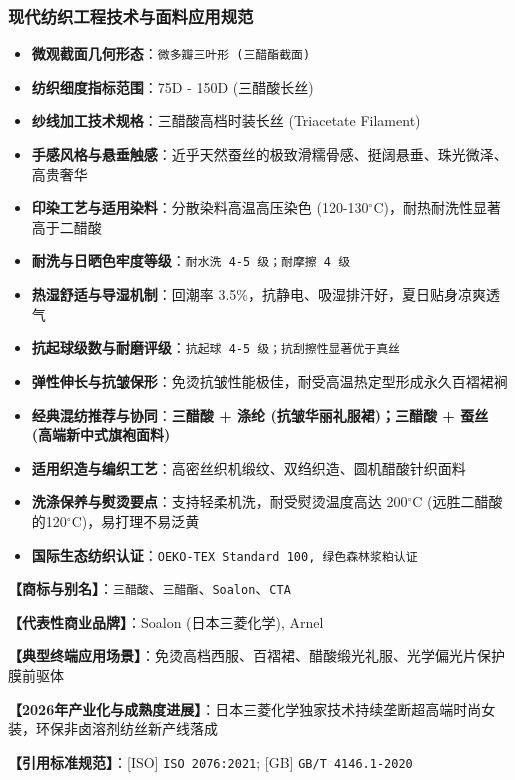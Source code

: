 \documentclass[11pt,openright,twoside,UTF8]{ctexbook}
\begin{document}
\subsubsection*{现代纺织工程技术与面料应用规范}
\begin{itemize} \setlength{\itemsep}{2pt}
    \item \textbf{微观截面几何形态}：\texttt{微多瓣三叶形 (三醋酯截面)}
    \item \textbf{纺织细度指标范围}：75D - 150D (三醋酸长丝)
    \item \textbf{纱线加工技术规格}：三醋酸高档时装长丝 (Triacetate Filament)
    \item \textbf{手感风格与悬垂触感}：近乎天然蚕丝的极致滑糯骨感、挺阔悬垂、珠光微泽、高贵奢华
    \item \textbf{印染工艺与适用染料}：分散染料高温高压染色 (120-130$^\circ\mathrm{C}$)，耐热耐洗性显著高于二醋酸
    \item \textbf{耐洗与日晒色牢度等级}：\texttt{耐水洗 4-5 级；耐摩擦 4 级}
    \item \textbf{热湿舒适与导湿机制}：回潮率 3.5\%，抗静电、吸湿排汗好，夏日贴身凉爽透气
    \item \textbf{抗起球级数与耐磨评级}：\texttt{抗起球 4-5 级；抗刮擦性显著优于真丝}
    \item \textbf{弹性伸长与抗皱保形}：免烫抗皱性能极佳，耐受高温热定型形成永久百褶裙裥
    \item \textbf{经典混纺推荐与协同}：\textbf{三醋酸 + 涤纶 (抗皱华丽礼服裙)；三醋酸 + 蚕丝 (高端新中式旗袍面料)}
    \item \textbf{适用织造与编织工艺}：高密丝织机缎纹、双绉织造、圆机醋酸针织面料
    \item \textbf{洗涤保养与熨烫要点}：支持轻柔机洗，耐受熨烫温度高达 200$^\circ\mathrm{C}$ (远胜二醋酸的120$^\circ\mathrm{C}$)，易打理不易泛黄
    \item \textbf{国际生态纺织认证}：\texttt{OEKO-TEX Standard 100, 绿色森林浆粕认证}
\end{itemize}
\vspace{0.2cm}

\noindent\textbf{【商标与别名】}：\texttt{三醋酸}、\texttt{三醋酯}、\texttt{Soalon}、\texttt{CTA}\par
\noindent\textbf{【代表性商业品牌】}：Soalon (日本三菱化学), Arnel\par
\noindent\textbf{【典型终端应用场景】}：免烫高档西服、百褶裙、醋酸缎光礼服、光学偏光片保护膜前驱体\par
\noindent\textbf{【2026年产业化与成熟度进展】}：日本三菱化学独家技术持续垄断超高端时尚女装，环保非卤溶剂纺丝新产线落成\par
\noindent\textbf{【引用标准规范】}：[ISO] \texttt{ISO 2076:2021}; [GB] \texttt{GB/T 4146.1-2020}\par
\vspace{0.5cm}
\end{document}
